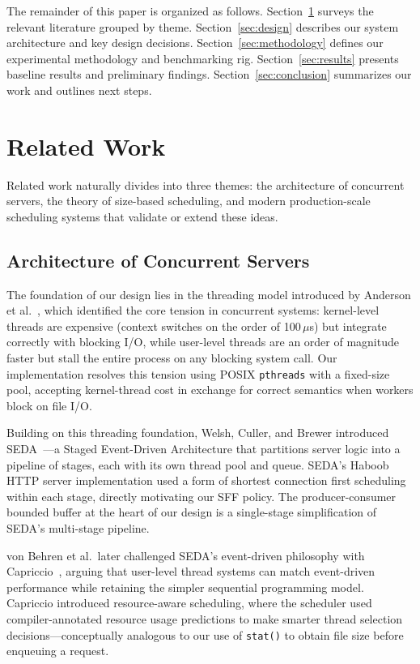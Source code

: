\documentclass[conference]{IEEEtran}
\begin{document}
The remainder of this paper is organized as follows. Section~\ref{sec:related}
surveys the relevant literature grouped by theme. Section~\ref{sec:design}
describes our system architecture and key design decisions.
Section~\ref{sec:methodology} defines our experimental methodology and
benchmarking rig. Section~\ref{sec:results} presents baseline results and
preliminary findings. Section~\ref{sec:conclusion} summarizes our work and
outlines next steps.

\section{Related Work}
\label{sec:related}

Related work naturally divides into three themes: the architecture of
concurrent servers, the theory of size-based scheduling, and modern
production-scale scheduling systems that validate or extend these ideas.

\subsection{Architecture of Concurrent Servers}

The foundation of our design lies in the threading model introduced by
Anderson et al.~\cite{anderson1992}, which identified the core tension in
concurrent systems: kernel-level threads are expensive (context switches on
the order of 100\,$\mu$s) but integrate correctly with blocking I/O, while
user-level threads are an order of magnitude faster but stall the entire
process on any blocking system call. Our implementation resolves this tension
using POSIX \texttt{pthreads} with a fixed-size pool, accepting kernel-thread
cost in exchange for correct semantics when workers block on file I/O.

Building on this threading foundation, Welsh, Culler, and Brewer introduced
SEDA~\cite{welsh2001}---a Staged Event-Driven Architecture that partitions
server logic into a pipeline of stages, each with its own thread pool and
queue. SEDA's Haboob HTTP server implementation used a form of shortest
connection first scheduling within each stage, directly motivating our SFF
policy. The producer-consumer bounded buffer at the heart of our design is a
single-stage simplification of SEDA's multi-stage pipeline.

von Behren et al.\ later challenged SEDA's event-driven philosophy with
Capriccio~\cite{vonbehren2003}, arguing that user-level thread systems can
match event-driven performance while retaining the simpler sequential
programming model. Capriccio introduced resource-aware scheduling, where the
scheduler used compiler-annotated resource usage predictions to make smarter
thread selection decisions---conceptually analogous to our use of
\texttt{stat()} to obtain file size before enqueuing a request.
\end{document}

